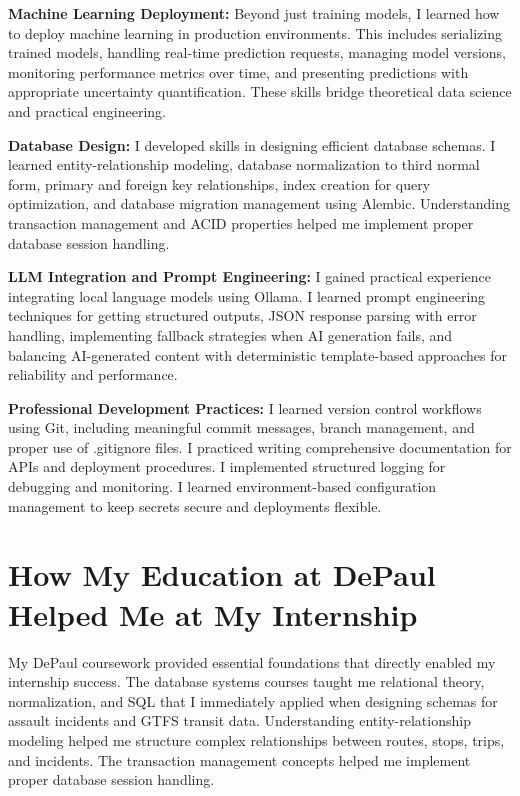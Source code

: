 \documentclass[12pt,letterpaper]{article}
\begin{document}
\textbf{Machine Learning Deployment:} Beyond just training models, I learned how to deploy machine learning in production environments. This includes serializing trained models, handling real-time prediction requests, managing model versions, monitoring performance metrics over time, and presenting predictions with appropriate uncertainty quantification. These skills bridge theoretical data science and practical engineering.

\textbf{Database Design:} I developed skills in designing efficient database schemas. I learned entity-relationship modeling, database normalization to third normal form, primary and foreign key relationships, index creation for query optimization, and database migration management using Alembic. Understanding transaction management and ACID properties helped me implement proper database session handling.

\textbf{LLM Integration and Prompt Engineering:} I gained practical experience integrating local language models using Ollama. I learned prompt engineering techniques for getting structured outputs, JSON response parsing with error handling, implementing fallback strategies when AI generation fails, and balancing AI-generated content with deterministic template-based approaches for reliability and performance.

\textbf{Professional Development Practices:} I learned version control workflows using Git, including meaningful commit messages, branch management, and proper use of .gitignore files. I practiced writing comprehensive documentation for APIs and deployment procedures. I implemented structured logging for debugging and monitoring. I learned environment-based configuration management to keep secrets secure and deployments flexible.

\section{How My Education at DePaul Helped Me at My Internship}

My DePaul coursework provided essential foundations that directly enabled my internship success. The database systems courses taught me relational theory, normalization, and SQL that I immediately applied when designing schemas for assault incidents and GTFS transit data. Understanding entity-relationship modeling helped me structure complex relationships between routes, stops, trips, and incidents. The transaction management concepts helped me implement proper database session handling.
\end{document}
